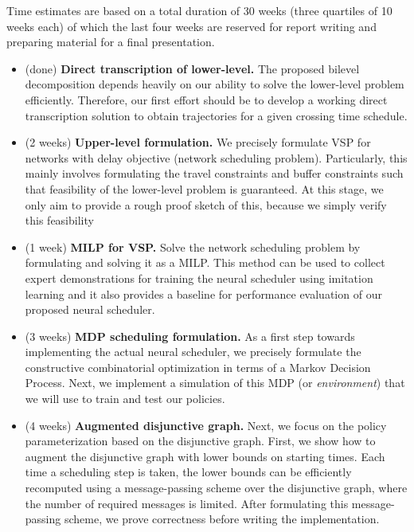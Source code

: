 \documentclass{article}
\theoremstyle{definition}
\theoremstyle{plain}
\begin{document}
Time estimates are based on a total duration of 30 weeks (three quartiles of 10
weeks each) of which the last four weeks are reserved for report writing and
preparing material for a final presentation.

\begin{itemize}
  \item (done) \textbf{Direct transcription of lower-level.} The proposed bilevel
        decomposition depends heavily on our ability to solve the lower-level
        problem efficiently. Therefore, our first effort should be to develop a
        working direct transcription solution to obtain trajectories for a given
        crossing time schedule.

  \item (2 weeks) \textbf{Upper-level formulation.} We precisely formulate VSP for
        networks with delay objective (network scheduling problem).
        Particularly, this mainly involves formulating the travel constraints
        and buffer constraints such that feasibility of the lower-level problem
        is guaranteed. At this stage, we only aim to provide a rough proof
        sketch of this, because we simply verify this feasibility


  \item (1 week) \textbf{MILP for VSP.} Solve the network scheduling problem by formulating and
        solving it as a MILP. This method can be used to collect expert
        demonstrations for training the neural scheduler using imitation
        learning and it also provides a baseline for performance evaluation of
        our proposed neural scheduler.

  \item (3 weeks) \textbf{MDP scheduling formulation.} As a first step towards implementing
        the actual neural scheduler, we precisely formulate the constructive
        combinatorial optimization in terms of a Markov Decision Process. Next,
        we implement a simulation of this MDP (or \textit{environment}) that we will
        use to train and test our policies.

  \item (4 weeks) \textbf{Augmented disjunctive graph.} Next, we focus on the policy
        parameterization based on the disjunctive graph. First, we show how to
        augment the disjunctive graph with lower bounds on starting times. Each
        time a scheduling step is taken, the lower bounds can be efficiently
        recomputed using a message-passing scheme over the disjunctive graph,
        where the number of required messages is limited. After formulating this
        message-passing scheme, we prove correctness before writing the
        implementation.


\end{itemize}
\end{document}
